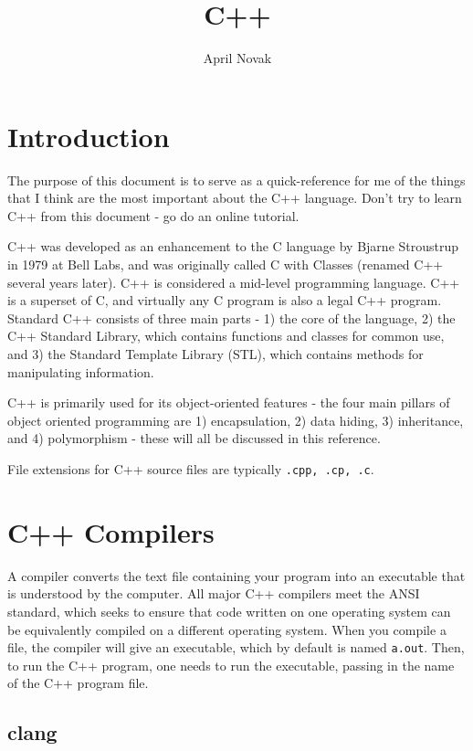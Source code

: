 \documentclass[10pt]{article}
\title{C++}
\author{April Novak}
\begin{document}
\maketitle
\section{Introduction}

The purpose of this document is to serve as a quick-reference for me of the things that I think are the most important about the C++ language. Don't try to learn C++ from this document - go do an online tutorial.

C++ was developed as an enhancement to the C language by Bjarne Stroustrup in 1979 at Bell Labs, and was originally called C with Classes (renamed C++ several years later). C++ is considered a mid-level programming language. C++ is a superset of C, and virtually any C program is also a legal C++ program. Standard C++ consists of three main parts - 1) the core of the language, 2) the C++ Standard Library, which contains functions and classes for common use, and 3) the Standard Template Library (STL), which contains methods for manipulating information.

C++ is primarily used for its object-oriented features - the four main pillars of object oriented programming are 1) encapsulation, 2) data hiding, 3) inheritance, and 4) polymorphism - these will all be discussed in this reference.

File extensions for C++ source files are typically \texttt{.cpp, .cp, .c}.

\section{C++ Compilers}

A compiler converts the text file containing your program into an executable that is understood by the computer. All major C++ compilers meet the ANSI standard, which seeks to ensure that code written on one operating system can be equivalently compiled on a different operating system. When you compile a file, the compiler will give an executable, which by default is named \texttt{a.out}. Then, to run the C++ program, one needs to run the executable, passing in the name of the C++ program file. 

\subsection{clang}
\end{document}
